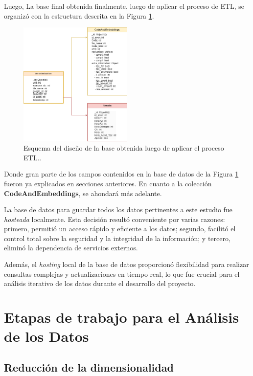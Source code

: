 \documentclass[11pt,a4paper,twoside,openany]{tesis}
\begin{document}
Luego, La base final obtenida finalmente, luego de aplicar el proceso de  ETL, se organizó con la estructura descrita en la Figura \ref{diagrama-base}.

\begin{figure}[H]
    \centering
    \includegraphics[width=0.5\textwidth]{imagenes/diagrama-base.png}
    \caption{Esquema del diseño de la base obtenida luego de aplicar el proceso ETL..}
    \label{diagrama-base}
\end{figure}

Donde gran parte de los campos contenidos en la base de datos de la Figura  \ref{diagrama-base} fueron ya explicados en secciones anteriores. En cuanto a la colección \textbf{CodeAndEmbeddings}, se ahondará más adelante.

La base de datos para guardar todos los datos pertinentes a este estudio fue \emph{hosteada} localmente. Esta decisión resultó conveniente por varias razones: primero, permitió un acceso rápido y eficiente a los datos; segundo, facilitó el control total sobre la seguridad y la integridad de la información; y tercero, eliminó la dependencia de servicios externos.

Además, el \emph{hosting} local de la base de datos proporcionó flexibilidad para realizar consultas complejas y actualizaciones en tiempo real, lo que fue crucial para el análisis iterativo de los datos durante el desarrollo del proyecto.

\section{Etapas de trabajo para el Análisis de los Datos}

\subsection{Reducción de la dimensionalidad}
\end{document}
